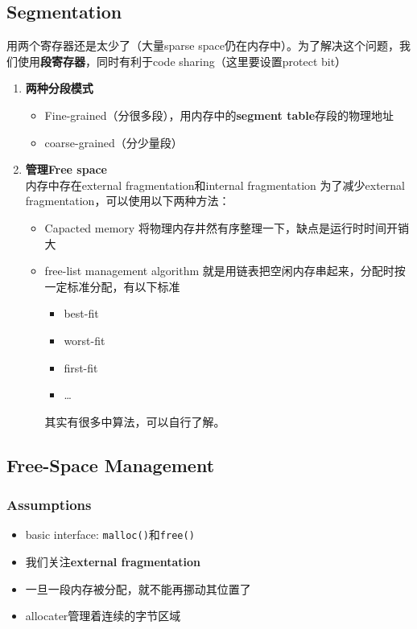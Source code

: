 \documentclass{article}
\begin{document}
\subsection{Segmentation}
用两个寄存器还是太少了（大量sparse space仍在内存中）。为了解决这个问题，我们使用\textbf{段寄存器}，同时有利于code sharing（这里要设置protect bit）
\begin{enumerate}
    \item \textbf{两种分段模式}
    \begin{itemize}
        \item Fine-grained（分很多段），用内存中的\textbf{segment table}存段的物理地址
        \item coarse-grained（分少量段）
    \end{itemize}
    \item \textbf{管理Free space} \\
    内存中存在external fragmentation和internal fragmentation
    为了减少external fragmentation，可以使用以下两种方法：
    \begin{itemize}
        \item Capacted memory 将物理内存井然有序整理一下，缺点是运行时时间开销大
        \item free-list management algorithm 就是用链表把空闲内存串起来，分配时按一定标准分配，有以下标准
            \begin{itemize}
                \item best-fit
                \item worst-fit
                \item first-fit
                \item \dots
            \end{itemize}
        其实有很多中算法，可以自行了解。
    \end{itemize}
    \end{enumerate}
\subsection{Free-Space Management}
\subsubsection{Assumptions}
\begin{itemize}
    \item basic interface: \texttt{malloc()}和\texttt{free()}
    \item 我们关注\textbf{external fragmentation}
    \item 一旦一段内存被分配，就不能再挪动其位置了
    \item allocater管理着连续的字节区域
\end{itemize}
\end{document}
